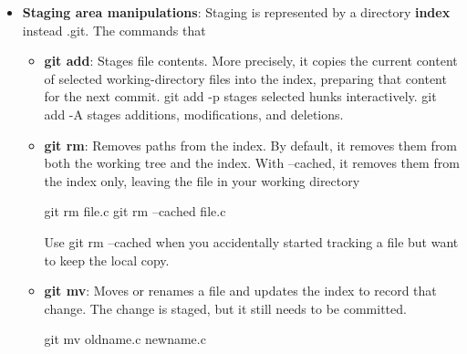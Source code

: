 \documentclass{report}
\begin{document}
\begin{itemize}
            \begin{bashcode}
                git stash --staged
            \end{bashcode}
            \bigbreak \noindent 
            stashes only the staged changes. That means Git takes the changes currently in the index/staging area and puts them into a stash. Your unstaged working-tree changes are left alone.
            \bigbreak \noindent 
            \begin{bashcode}
                git stash --keep-indexd 
            \end{bashcode}
            \bigbreak \noindent 
            This stashes your unstaged changes, but keeps your staged changes in place.
            \bigbreak \noindent 
            In other words, the index is preserved.
        \item \textbf{Staging area manipulations}: Staging is represented by a directory \textbf{index} instead .git. The commands that 
            \begin{itemize}
                \item \textbf{git add}: Stages file contents. More precisely, it copies the current content of selected working-directory files into the index, preparing that content for the next commit. git add -p stages selected hunks interactively. git add -A stages additions, modifications, and deletions.
                \item \textbf{git rm}: Removes paths from the index. By default, it removes them from both the working tree and the index. With --cached, it removes them from the index only, leaving the file in your working directory 
                    \bigbreak \noindent 
                    \begin{bashcode}
                        git rm file.c
                        git rm --cached file.c
                    \end{bashcode}
                    \bigbreak \noindent 
                    Use git rm --cached when you accidentally started tracking a file but want to keep the local copy.
                \item \textbf{git mv}: Moves or renames a file and updates the index to record that change. The change is staged, but it still needs to be committed.
                    \bigbreak \noindent 
                    \begin{bashcode}
                        git mv oldname.c newname.c
                    \end{bashcode}
                    \bigbreak \noindent 

\end{itemize}
\end{itemize}
\end{document}
